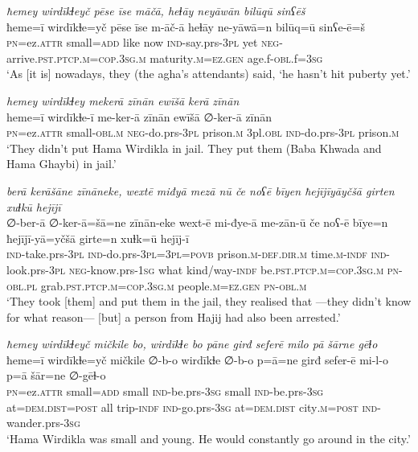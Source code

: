 \ea \label{BP.132}
\textit{ħemey wirdīkɫeyč pēse īse māčā, heɫāy neyāwān bilūqū sinʕēš} \\ 
\gll ħeme=ī wirdīkɫe=yč pēse īse m-āč-ā heɫāy ne-yāwā=n bilūq=ū sinʕe-ē=š \\ 
 \textsc{pn}=ez.\textsc{attr} small\textsc{=add} like now \textsc{ind-}say.prs\textsc{-3pl} yet \textsc{neg-}arrive\textsc{.pst}\textsc{.ptcp}\textsc{.m}\textsc{=cop}\textsc{.3sg}\textsc{.m} maturity\textsc{.m}\textsc{=ez.gen} age.f\textsc{-obl}.f\textsc{=3sg} \\ 
\glt `As [it is] nowadays, they (the agha’s attendants) said, ‘he hasn’t hit puberty yet.'
\z 
 
\ea \label{BP.138}
\textit{hemey wirdīkɫey mekerā zīnān ewīšā kerā zīnān} \\ 
\gll heme=ī wirdīkɫe-ī me-ker-ā zīnān ewīšā ∅-ker-ā zīnān \\ 
 \textsc{pn}=ez.\textsc{attr} small\textsc{-obl}\textsc{.m} \textsc{neg-}do.prs\textsc{-3pl} prison\textsc{.m} 3pl\textsc{.obl} \textsc{ind-}do.prs\textsc{-3pl} prison\textsc{.m} \\ 
\glt `They didn’t put Hama Wirdikla in jail. They put them (Baba Khwada and Hama Ghaybi) in jail.'
\z 
 
\ea \label{BP.139}
\textit{berā kerāšāne zīnāneke, wextē miđyā mezā nū če noʕē bīyen ħejījīyāyčšā girten xuɫkū hejījī} \\ 
\gll ∅-ber-ā ∅-ker-ā=šā=ne zīnān-eke wext-ē mi-đye-ā me-zān-ū če noʕ-ē bīye=n ħejījī-yā=yčšā girte=n xuɫk=ū hejīj-ī \\ 
 \textsc{ind-}take.prs\textsc{-3pl} \textsc{ind-}do.prs\textsc{-3pl}\textsc{=3pl}\textsc{=\textsc{povb}} prison\textsc{.m}\textsc{-def}\textsc{.dir}\textsc{.m} time\textsc{.m}\textsc{-indf} \textsc{ind-}look.prs\textsc{-3pl} \textsc{neg-}know.prs\textsc{-\textsc{1sg}} what kind/way\textsc{-indf} be\textsc{.pst}\textsc{.ptcp}\textsc{.m}\textsc{=cop}\textsc{.3sg}\textsc{.m} \textsc{pn}\textsc{-obl}\textsc{.pl} grab\textsc{.pst}\textsc{.ptcp}\textsc{.m}\textsc{=cop}\textsc{.3sg}\textsc{.m} people\textsc{.m}\textsc{=ez.gen} \textsc{pn}\textsc{-obl}\textsc{.m} \\ 
\glt `They took [them] and put them in the jail, they realised that —they didn’t know for what reason— [but] a person from Hajij had also been arrested.'
\z 
 
\ea \label{BP.143}
\textit{ħemey wirdīkɫeyč mičkile bo, wirdīkɫe bo pāne girđ seferē milo pā šārne gēɫo} \\ 
\gll ħeme=ī wirdīkɫe=yč mičkile ∅-b-o wirdīkɫe ∅-b-o p=ā=ne girđ sefer-ē mi-l-o p=ā šār=ne ∅-gēɫ-o \\ 
 \textsc{pn}=ez.\textsc{attr} small\textsc{=add} small \textsc{ind-}be.prs\textsc{-3sg} small \textsc{ind-}be.prs\textsc{-3sg} at=\textsc{dem.dist}\textsc{=\textsc{post}} all trip\textsc{-indf} \textsc{ind-}go.prs\textsc{-3sg} at=\textsc{dem.dist} city\textsc{.m}\textsc{=\textsc{post}} \textsc{ind-}wander.prs\textsc{-3sg} \\ 
\glt `Hama Wirdikla was small and young. He would constantly go around in the city.'
\z 
 
